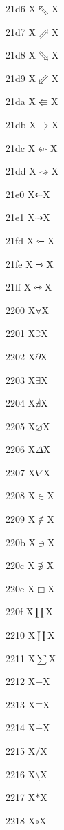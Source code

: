 \documentclass[11pt]{article}
\begin{document}
21d6 X{\ensuremath{\Nwarrow}}X

21d7 X{\ensuremath{\Nearrow}}X

21d8 X{\ensuremath{\Searrow}}X

21d9 X{\ensuremath{\Swarrow}}X

21da X{\ensuremath{\Lleftarrow}}X

21db X{\ensuremath{\Rrightarrow}}X

21dc X{\ensuremath{\leftsquigarrow}}X

21dd X{\ensuremath{\rightsquigarrow}}X

21e0 X{\ensuremath{\dashleftarrow}}X

21e1 X{\ensuremath{\dashrightarrow}}X

21fd X{\ensuremath{\leftarrowtriangle}}X

21fe X{\ensuremath{\rightarrowtriangle}}X

21ff X{\ensuremath{\leftrightarrowtriangle}}X

2200 X{\ensuremath{\forall}}X

2201 X{\ensuremath{\complement}}X

2202 X{\ensuremath{\partial}}X

2203 X{\ensuremath{\exists}}X

2204 X{\ensuremath{\nexists}}X

2205 X{\ensuremath{\varnothing}}X

2206 X{\ensuremath{\Delta}}X

2207 X{\ensuremath{\nabla}}X

2208 X{\ensuremath{\in}}X

2209 X{\ensuremath{\notin}}X

220b X{\ensuremath{\ni}}X

220c X{\ensuremath{\notni}}X

220e X{\ensuremath{\Box}}X

220f X{\ensuremath{\prod}}X

2210 X{\ensuremath{\coprod}}X

2211 X{\ensuremath{\sum}}X

2212 X{\ensuremath{-}}X

2213 X{\ensuremath{\mp}}X

2214 X{\ensuremath{\dotplus}}X

2215 X{\ensuremath{/}}X

2216 X{\ensuremath{\setminus}}X

2217 X{\ensuremath{\ast}}X

2218 X{\ensuremath{\circ}}X
\end{document}
